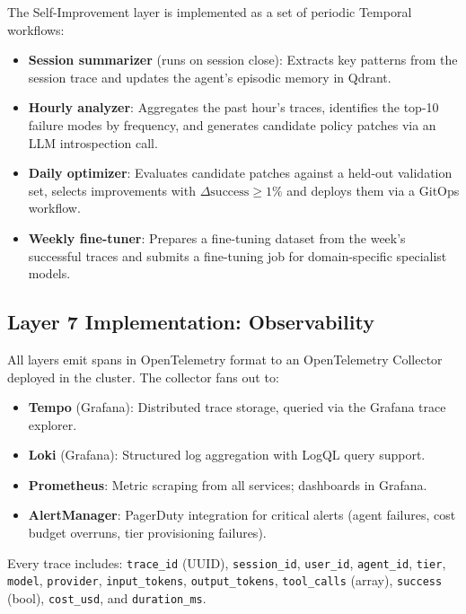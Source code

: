 The Self-Improvement layer is implemented as a set of periodic Temporal
workflows:
\begin{itemize}[leftmargin=1.5em]
    \item \textbf{Session summarizer} (runs on session close): Extracts key
          patterns from the session trace and updates the agent's episodic
          memory in Qdrant.
    \item \textbf{Hourly analyzer}: Aggregates the past hour's traces,
          identifies the top-10 failure modes by frequency, and generates
          candidate policy patches via an LLM introspection call.
    \item \textbf{Daily optimizer}: Evaluates candidate patches against a
          held-out validation set, selects improvements with
          $\Delta\text{success} \geq 1\%$ and deploys them via a GitOps
          workflow.
    \item \textbf{Weekly fine-tuner}: Prepares a fine-tuning dataset from
          the week's successful traces and submits a fine-tuning job for
          domain-specific specialist models.
\end{itemize}

\subsection{Layer 7 Implementation: Observability}

All layers emit spans in OpenTelemetry format to an OpenTelemetry
Collector deployed in the cluster. The collector fans out to:
\begin{itemize}[leftmargin=1.5em]
    \item \textbf{Tempo} (Grafana): Distributed trace storage, queried
          via the Grafana trace explorer.
    \item \textbf{Loki} (Grafana): Structured log aggregation with
          LogQL query support.
    \item \textbf{Prometheus}: Metric scraping from all services;
          dashboards in Grafana.
    \item \textbf{AlertManager}: PagerDuty integration for critical
          alerts (agent failures, cost budget overruns, tier provisioning
          failures).
\end{itemize}

Every trace includes: \texttt{trace\_id} (UUID), \texttt{session\_id},
\texttt{user\_id}, \texttt{agent\_id}, \texttt{tier}, \texttt{model},
\texttt{provider}, \texttt{input\_tokens}, \texttt{output\_tokens},
\texttt{tool\_calls} (array), \texttt{success} (bool), \texttt{cost\_usd},
and \texttt{duration\_ms}.

